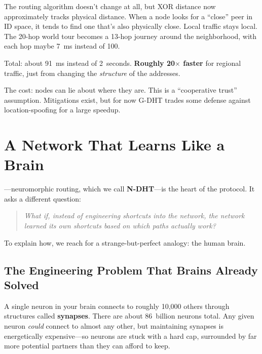 \documentclass[nobib]{tufte-handout}
\begin{document}
The routing algorithm doesn't change at all, but XOR distance now approximately tracks physical distance. When a node looks for a ``close'' peer in ID space, it tends to find one that's also physically close. Local traffic stays local. The 20-hop world tour becomes a 13-hop journey around the neighborhood, with each hop maybe 7~ms instead of 100.

Total: about 91~ms instead of 2~seconds. \textbf{Roughly 20$\times$ faster} for regional traffic, just from changing the \emph{structure} of the addresses.

The cost: nodes can lie about where they are. This is a ``cooperative trust'' assumption. Mitigations exist, but for now G-DHT trades some defense against location-spoofing for a large speedup.

\section{A Network That Learns Like a Brain}

---neuromorphic routing, which we call \textbf{N-DHT}---is the heart of the protocol. It asks a different question:

\begin{quote}
\itshape What if, instead of engineering shortcuts into the network, the network learned its own shortcuts based on which paths actually work?
\end{quote}

To explain how, we reach for a strange-but-perfect analogy: the human brain.

\subsection{The Engineering Problem That Brains Already Solved}

A single neuron in your brain connects to roughly 10{,}000 others through structures called \textbf{synapses}. There are about 86~billion neurons total. Any given neuron \emph{could} connect to almost any other, but maintaining synapses is energetically expensive---so neurons are stuck with a hard cap, surrounded by far more potential partners than they can afford to keep.
\end{document}
